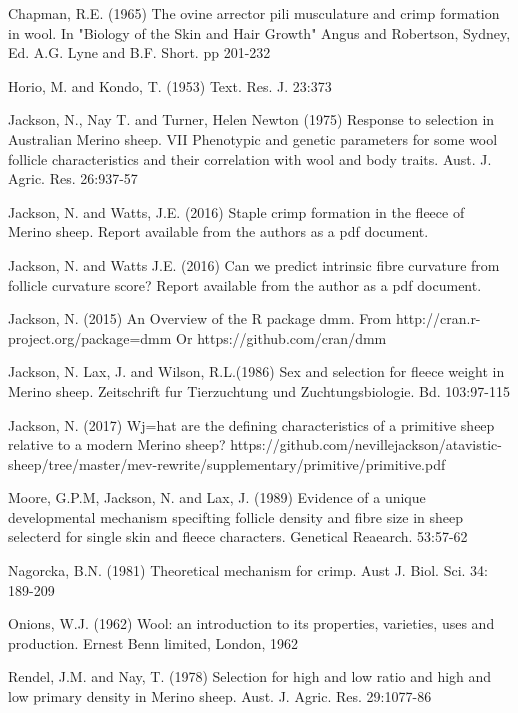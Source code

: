 \documentclass[titlepage]{article}  %
\begin{document}
\begin{thebibliography}{99}

Chapman, R.E. (1965) The ovine arrector pili musculature and crimp formation 
    in wool. In "Biology of the Skin and Hair Growth" Angus and Robertson,
    Sydney, Ed. A.G. Lyne and B.F. Short. pp 201-232

Horio, M. and Kondo, T. (1953) Text. Res. J. 23:373

Jackson, N., Nay T. and Turner, Helen Newton (1975) Response to selection
    in Australian Merino sheep. VII Phenotypic and genetic parameters for
    some wool follicle characteristics and their correlation with wool and
    body traits. Aust. J. Agric. Res. 26:937-57

Jackson, N. and Watts, J.E. (2016) Staple crimp formation in the fleece of Merino sheep. 
Report available from the authors as a pdf document.

Jackson, N.  and Watts J.E. (2016) Can we predict intrinsic fibre curvature from follicle curvature score? Report available from the author as a pdf document.

Jackson, N. (2015) An Overview of the R package dmm.
    From http://cran.r-project.org/package=dmm
    Or https://github.com/cran/dmm

Jackson, N. Lax, J. and Wilson, R.L.(1986) Sex and selection for fleece weight in Merino sheep. Zeitschrift fur Tierzuchtung und Zuchtungsbiologie. Bd. 103:97-115

Jackson, N. (2017) Wj=hat are the defining characteristics of a primitive sheep relative to a modern Merino sheep? https://github.com/nevillejackson/atavistic-sheep/tree/master/mev-rewrite/supplementary/primitive/primitive.pdf

Moore, G.P.M, Jackson, N. and Lax, J. (1989) Evidence of a unique developmental mechanism specifting follicle density and fibre size in sheep selecterd for single skin and fleece characters. Genetical Reaearch. 53:57-62

Nagorcka, B.N. (1981) Theoretical mechanism for crimp.
     Aust J. Biol. Sci. 34: 189-209

Onions, W.J. (1962) Wool: an introduction to its properties, varieties, uses
     and production. Ernest Benn limited, London, 1962

Rendel, J.M. and Nay, T. (1978) Selection for high and low ratio and high 
    and low primary density in Merino sheep. 
    Aust. J. Agric. Res. 29:1077-86


\end{thebibliography}
\end{document}
